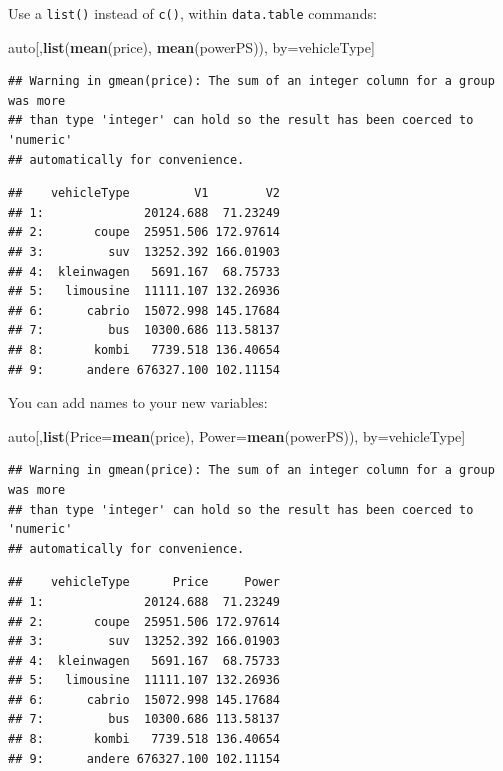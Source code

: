 \documentclass[]{book}
\newenvironment{Shaded}{\begin{snugshade}}{\end{snugshade}}
\newcommand{\KeywordTok}[1]{\textcolor[rgb]{0.13,0.29,0.53}{\textbf{#1}}}
\newcommand{\DataTypeTok}[1]{\textcolor[rgb]{0.13,0.29,0.53}{#1}}
\newcommand{\NormalTok}[1]{#1}
\theoremstyle{definition}
\theoremstyle{definition}
\theoremstyle{definition}
\theoremstyle{remark}
\begin{document}
Use a \texttt{list()} instead of \texttt{c()}, within
\texttt{data.table} commands:

\begin{Shaded}
\begin{Highlighting}[]
\NormalTok{auto[,}\KeywordTok{list}\NormalTok{(}\KeywordTok{mean}\NormalTok{(price), }\KeywordTok{mean}\NormalTok{(powerPS)), by=vehicleType]}
\end{Highlighting}
\end{Shaded}

\begin{verbatim}
## Warning in gmean(price): The sum of an integer column for a group was more
## than type 'integer' can hold so the result has been coerced to 'numeric'
## automatically for convenience.
\end{verbatim}

\begin{verbatim}
##    vehicleType         V1        V2
## 1:              20124.688  71.23249
## 2:       coupe  25951.506 172.97614
## 3:         suv  13252.392 166.01903
## 4:  kleinwagen   5691.167  68.75733
## 5:   limousine  11111.107 132.26936
## 6:      cabrio  15072.998 145.17684
## 7:         bus  10300.686 113.58137
## 8:       kombi   7739.518 136.40654
## 9:      andere 676327.100 102.11154
\end{verbatim}

You can add names to your new variables:

\begin{Shaded}
\begin{Highlighting}[]
\NormalTok{auto[,}\KeywordTok{list}\NormalTok{(}\DataTypeTok{Price=}\KeywordTok{mean}\NormalTok{(price), }\DataTypeTok{Power=}\KeywordTok{mean}\NormalTok{(powerPS)), by=vehicleType]}
\end{Highlighting}
\end{Shaded}

\begin{verbatim}
## Warning in gmean(price): The sum of an integer column for a group was more
## than type 'integer' can hold so the result has been coerced to 'numeric'
## automatically for convenience.
\end{verbatim}

\begin{verbatim}
##    vehicleType      Price     Power
## 1:              20124.688  71.23249
## 2:       coupe  25951.506 172.97614
## 3:         suv  13252.392 166.01903
## 4:  kleinwagen   5691.167  68.75733
## 5:   limousine  11111.107 132.26936
## 6:      cabrio  15072.998 145.17684
## 7:         bus  10300.686 113.58137
## 8:       kombi   7739.518 136.40654
## 9:      andere 676327.100 102.11154
\end{verbatim}
\end{document}
